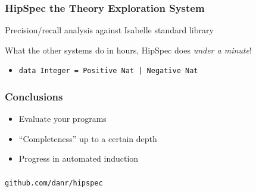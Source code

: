 \documentclass[serif,professionalfont]{beamer}
\newcommand\dn[0]{\vspace{\baselineskip}}
\newcommand\hs[1]{\texttt{#1}}
\begin{document}
\begin{frame}
  \frametitle{HipSpec the Theory Exploration System}


  Precision/recall analysis against Isabelle standard library


  \pause

  \dn

  What the other systems do in hours, HipSpec does \emph{under a minute}!

  \pause

  \dn

  \begin{itemize}
    \item \hs{data Integer = Positive Nat | Negative Nat}
  \end{itemize}


\end{frame}



\begin{frame}
  \frametitle{Conclusions}
  \begin{itemize}
    \item Evaluate your programs
    \pause
    \item ``Completeness'' up to a certain depth
    \pause
    \item Progress in automated induction
  \end{itemize}
\end{frame}

\begin{frame}
\frametitle{}
\begin{center}
\hs{github.com/danr/hipspec}
\end{center}
\end{frame}
\end{document}
